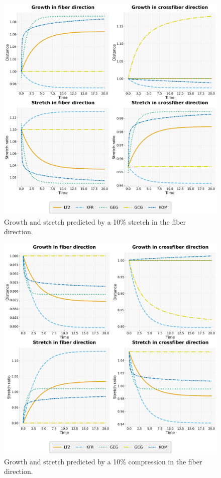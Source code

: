 \begin{figure}[h]
    \centering
    \includegraphics[width=\textwidth]{10p_stretch_3.png}
    \caption{Growth and stretch predicted by a 10\% stretch in the fiber direction.}
    \label{fig:10p_stretch}
\end{figure}
\begin{figure}[h]
    \centering
    \includegraphics[width=\textwidth]{10p_compression_3.png}
    \caption{Growth and stretch predicted by a 10\% compression in the fiber direction.}
    \label{fig:10p_compression}
\end{figure}    

